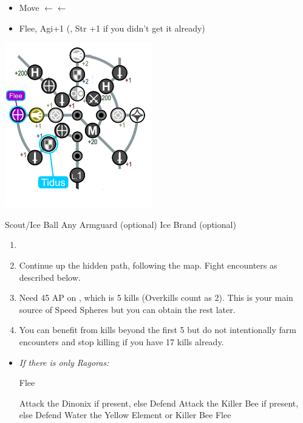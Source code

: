 \begin{spheregrid}
    \begin{itemize}
        \tidusf
        \begin{itemize}
            \item Move $\leftarrow\leftarrow$
            \item Flee, Agi+1 (, Str +1 if you didn't get it already)
        \end{itemize}
    \end{itemize}
    \includegraphics{graphics/Tidus_Kilika}
\end{spheregrid}
\begin{equip}
    \begin{itemize}
        \wakkaf Scout/Ice Ball
        \wakkaf Any Armguard (optional)
        \tidusf Ice Brand (optional)
    \end{itemize}
\end{equip}
\begin{enumerate}[resume]
    \item \formation{\tidus}{\wakka}{\lulu}
    \item Continue up the hidden path, following the map. Fight encounters as described below.
    \item Need 45 AP on \tidus, which is 5 kills (Overkills count as 2). This is your main source of Speed Spheres but you can obtain the rest later.
    \item You can benefit from kills beyond the first 5 but do not intentionally farm encounters and stop killing if you have 17 kills already.
\end{enumerate}
\begin{encounters}
    \begin{itemize}
        \item \textit{If there is only Ragoras:}
        \begin{itemize}
            \tidusf Flee
        \end{itemize}
        \tidusf Attack the Dinonix if present, else Defend
        \wakkaf Attack the Killer Bee if present, else Defend
        \luluf Water the Yellow Element or Killer Bee
        \tidusf Flee
    \end{itemize}
\end{encounters}
